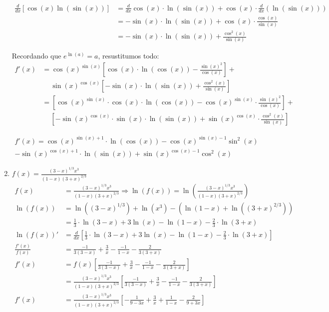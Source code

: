 \documentclass[12pt]{article}
\begin{document}
\begin{enumerate}[\hspace{9px} a)]
        \begin{align*}
            \frac{d}{dx}[\cos(x)\ln(\sin(x))] &= \frac{d}{dx}\cos(x)\cdot\ln(\sin(x)) + \cos(x)\cdot\frac{d}{dx}(\ln(\sin(x)))\\
            &= -\sin(x)\cdot\ln(\sin(x))+\cos(x)\cdot\frac{\cos(x)}{\sin(x)}\\
            &= -\sin(x)\cdot\ln(\sin(x))+\frac{\cos^2(x)}{\sin(x)}
        \end{align*}

        Recordando que \(e^{\ln(a)}=a\), resustitumos todo:
        \begin{align*}
            f'(x) &= \cos(x)^{\sin(x)}\left[\cos(x)\cdot\ln(\cos(x)) - \frac{\sin(x)^2}{\cos(x)}\right]+\\
            & \quad  \ \sin(x)^{\cos(x)}\left[-\sin(x)\cdot\ln(\sin(x))+\frac{\cos^2(x)}{\sin(x)}\right]\\
            &= \left[\cos(x)^{\sin(x)}\cdot\cos(x)\cdot\ln(\cos(x)) - \cos(x)^{\sin(x)}\cdot\frac{\sin(x)^2}{\cos(x)}\right]+\\
            & \quad \ \left[-\sin(x)^{\cos(x)}\cdot\sin(x)\cdot\ln(\sin(x)) + \sin(x)^{\cos(x)}\cdot\frac{\cos^2(x)}{\sin(x)}\right]
        \end{align*}

        \begin{multline*}
            f'(x) = \cos(x)^{\sin(x)+1}\cdot\ln(\cos(x)) - \cos(x)^{\sin(x)-1}\sin^2(x) \\- \sin(x)^{\cos(x)+1}\cdot\ln(\sin(x)) + \sin(x)^{\cos(x)-1}\cos^2(x)
        \end{multline*}

    \item \(f(x)=\displaystyle\frac{(3-x)^{1/3}x^3}{(1-x)(3+x)^{2/3}}\)\bigskip
        \begin{align*}
            f(x)&= \frac{(3-x)^{1/3}x^3}{(1-x)(3+x)^{2/3}} \Longrightarrow \ln(f(x)) = \ln\left(\frac{(3-x)^{1/3}x^3}{(1-x)(3+x)^{2/3}}\right)\\
            \ln(f(x)) &= \ln((3-x)^{1/3}) + \ln(x^3) - (\ln(1-x) + \ln((3+x)^{2/3}))\\
            &= \frac{1}{3}\cdot\ln(3-x) + 3\ln(x) - \ln(1-x) - \frac{2}{3}\cdot\ln(3+x)\\
            \ln(f(x))' &= \frac{d}{dx}\left[\frac{1}{3}\cdot\ln(3-x) + 3\ln(x) - \ln(1-x) - \frac{2}{3}\cdot\ln(3+x)\right]\\
            \frac{f'(x)}{f(x)} &= \frac{-1}{3(3-x)} + \frac{3}{x} - \frac{-1}{1-x} - \frac{2}{3(3+x)}\\
            f'(x)&=f(x)\left[\frac{-1}{3(3-x)} + \frac{3}{x} - \frac{-1}{1-x} - \frac{2}{3(3+x)}\right]\\
            &= \frac{(3-x)^{1/3}x^3}{(1-x)(3+x)^{2/3}}\left[\frac{-1}{3(3-x)} + \frac{3}{x} - \frac{-1}{1-x} - \frac{2}{3(3+x)}\right]\\
            f'(x)&= \frac{(3-x)^{1/3}x^3}{(1-x)(3+x)^{2/3}}\left[-\frac{1}{9-3x} + \frac{3}{x} + \frac{1}{1-x} - \frac{2}{9+3x}\right]
        \end{align*}


\end{enumerate}
\end{document}
